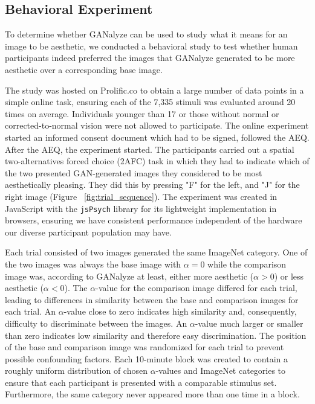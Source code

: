 \documentclass[../main.tex]{subfiles}
\begin{document}
	
	
\subsection{Behavioral Experiment}
To determine whether GANalyze can be used to study what it means for an image to be aesthetic, we conducted a behavioral study to test whether human participants indeed preferred the images that GANalyze generated to be more aesthetic over a corresponding base image.
	
The study was hosted on Prolific.co to obtain a large number of data points in a simple online task, ensuring each of the 7,335 stimuli was evaluated around 20 times on average. Individuals younger than 17 or those without normal or corrected-to-normal vision were not allowed to participate. The online experiment started an informed consent document which had to be signed, followed the AEQ. After the AEQ, the experiment started.	The participants carried out a spatial two-alternatives forced choice (2AFC) task in which they had to indicate which of the two presented GAN-generated images they considered to be most aesthetically pleasing. They did this by pressing "F" for the left, and "J" for the right image (Figure ~\ref{fig:trial_sequence}). The experiment was created in JavaScript with the \texttt{jsPsych} library \parencite{de2015jspsych} for its lightweight implementation in browsers, ensuring we have consistent performance independent of the hardware our diverse participant population may have.
	
Each trial consisted of two images generated the same ImageNet category. One of the two images was always the base image with $\alpha = 0$ while the comparison image was, according to GANalyze at least, either more aesthetic ($\alpha > 0$) or less aesthetic ($\alpha < 0$). The $\alpha$-value for the comparison image differed for each trial, leading to differences in similarity between the base and comparison images for each trial. An $\alpha$-value close to zero indicates high similarity and, consequently, difficulty to discriminate between the images. An $\alpha$-value much larger or smaller than zero indicates low similarity and therefore easy discrimination. The position of the base and comparison image was randomized for each trial to prevent possible confounding factors. Each 10-minute block was created to contain a roughly uniform distribution of chosen $\alpha$-values and ImageNet categories to ensure that each participant is presented with a comparable stimulus set. Furthermore, the same category never appeared more than one time in a block.
	
\end{document}
